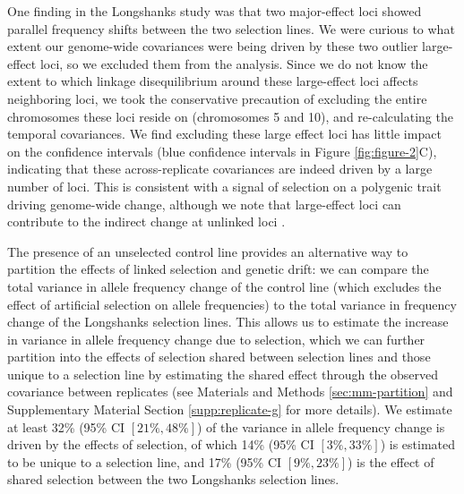 \documentclass[11pt]{article}
\begin{document}
One finding in the Longshanks study was that two major-effect loci showed
parallel frequency shifts between the two selection lines. We were curious to
what extent our genome-wide covariances were being driven by these two outlier
large-effect loci, so we excluded them from the analysis. Since we do not know
the extent to which linkage disequilibrium around these large-effect loci
affects neighboring loci, we took the conservative precaution of excluding the
entire chromosomes these loci reside on (chromosomes 5 and 10), and
re-calculating the temporal covariances. We find excluding these large effect
loci has little impact on the confidence intervals (blue confidence intervals
in Figure \ref{fig:figure-2}C), indicating that these across-replicate
covariances are indeed driven by a large number of loci. This is consistent
with a signal of selection on a polygenic trait driving genome-wide change,
although we note that large-effect loci can contribute to the indirect change
at unlinked loci \parencite{Robertson1961-ho,Santiago1995-hx}. 

The presence of an unselected control line provides an alternative way to
partition the effects of linked selection and genetic drift: we can compare the
total variance in allele frequency change of the control line (which excludes
the effect of artificial selection on allele frequencies) to the total variance
in frequency change of the Longshanks selection lines. This allows us to
estimate the increase in variance in allele frequency change due to selection,
which we can further partition into the effects of selection shared between
selection lines and those unique to a selection line by estimating the shared
effect through the observed covariance between replicates (see Materials and
Methods \ref{sec:mm-partition} and Supplementary Material Section
\ref{supp:replicate-g} for more details).  We estimate at least 32\% (95\% CI
$[21\%, 48\%]$) of the variance in allele frequency change is driven by the
effects of selection, of which 14\% (95\% CI $[3\%, 33\%]$) is estimated to be
unique to a selection line, and 17\% (95\% CI $[9\%, 23\%]$) is the effect of
shared selection between the two Longshanks selection lines. 
\end{document}
